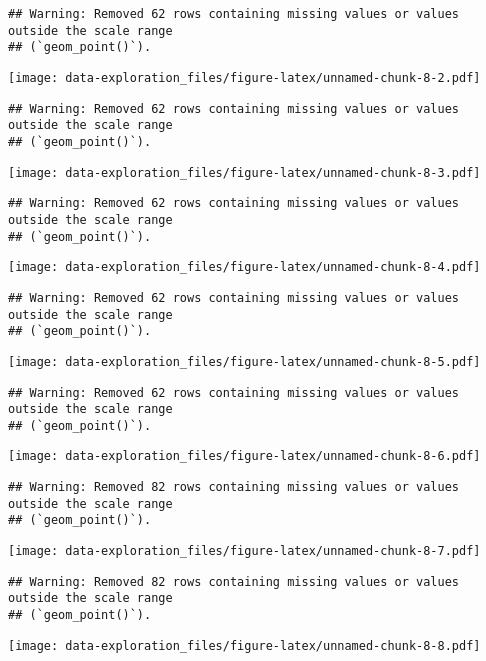 \documentclass[
]{article}
\begin{document}
\begin{verbatim}
## Warning: Removed 62 rows containing missing values or values outside the scale range
## (`geom_point()`).
\end{verbatim}

\texttt{[image: data-exploration\_files/figure-latex/unnamed-chunk-8-2.pdf]}

\begin{verbatim}
## Warning: Removed 62 rows containing missing values or values outside the scale range
## (`geom_point()`).
\end{verbatim}

\texttt{[image: data-exploration\_files/figure-latex/unnamed-chunk-8-3.pdf]}

\begin{verbatim}
## Warning: Removed 62 rows containing missing values or values outside the scale range
## (`geom_point()`).
\end{verbatim}

\texttt{[image: data-exploration\_files/figure-latex/unnamed-chunk-8-4.pdf]}

\begin{verbatim}
## Warning: Removed 62 rows containing missing values or values outside the scale range
## (`geom_point()`).
\end{verbatim}

\texttt{[image: data-exploration\_files/figure-latex/unnamed-chunk-8-5.pdf]}

\begin{verbatim}
## Warning: Removed 62 rows containing missing values or values outside the scale range
## (`geom_point()`).
\end{verbatim}

\texttt{[image: data-exploration\_files/figure-latex/unnamed-chunk-8-6.pdf]}

\begin{verbatim}
## Warning: Removed 82 rows containing missing values or values outside the scale range
## (`geom_point()`).
\end{verbatim}

\texttt{[image: data-exploration\_files/figure-latex/unnamed-chunk-8-7.pdf]}

\begin{verbatim}
## Warning: Removed 82 rows containing missing values or values outside the scale range
## (`geom_point()`).
\end{verbatim}

\texttt{[image: data-exploration\_files/figure-latex/unnamed-chunk-8-8.pdf]}
\end{document}
